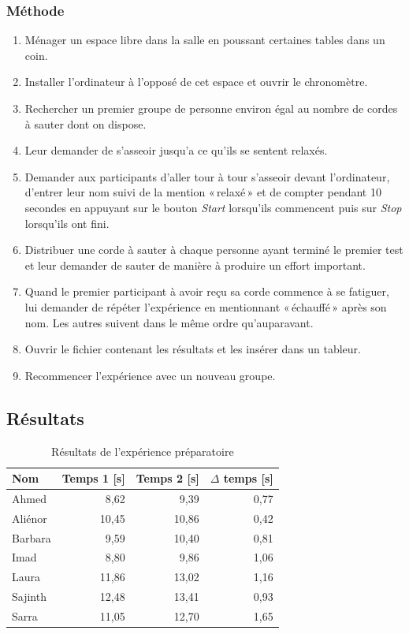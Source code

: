 \documentclass[12pt,fleqn,oneside,french,openany]{book} %
\begin{document}
\subsubsection{Méthode} \label{sssec:methode2.1}
\begin{enumerate}
	\item Ménager un espace libre dans la salle en poussant certaines tables dans un coin.
	\item Installer l'ordinateur à l'opposé de cet espace et ouvrir le chronomètre.
	\item Rechercher un premier groupe de personne environ égal au nombre de cordes à sauter dont on dispose.
	\item Leur demander de s'asseoir jusqu'a ce qu'ils se sentent relaxés.
	\item Demander aux participants d'aller tour à tour s'asseoir devant l'ordinateur, d'entrer leur nom suivi de la mention «\,relaxé\,» et de compter pendant 10 secondes en appuyant sur le bouton \emph{Start} lorsqu'ils commencent puis sur \emph{Stop} lorsqu'ils ont fini.
	\item Distribuer une corde à sauter à chaque personne ayant terminé le premier test et leur demander de sauter de manière à produire un effort important.
	\item Quand le premier participant à avoir reçu sa corde commence à se fatiguer, lui demander de répéter l'expérience en mentionnant «\,échauffé\,» après son nom. Les autres suivent dans le même ordre qu'auparavant.
	\item Ouvrir le fichier contenant les résultats et les insérer dans un tableur.
	\item Recommencer l'expérience avec un nouveau groupe.
\end{enumerate}

\subsection{Résultats} \label{ssec:resultats2.1}

\begin{table}[h]
	\centering
	\caption{Résultats de l'expérience préparatoire} \label{tbl:exp2.1}
	\begin{tabular}{lrrr}
		\toprule 
		\textbf{Nom} & \textbf{Temps 1 [s]} & \textbf{Temps 2 [s]} & \textbf{$\Delta$ temps [s]} \\ \midrule
		Ahmed & 8,62 & 9,39 & 0,77 \\
		Aliénor & 10,45 & 10,86 & 0,42 \\
		Barbara & 9,59 & 10,40 & 0,81 \\
		Imad & 8,80 & 9,86 & 1,06 \\
		Laura & 11,86 & 13,02 & 1,16 \\
		Sajinth & 12,48 & 13,41 & 0,93 \\
		Sarra & 11,05 & 12,70 & 1,65 \\ \bottomrule
	\end{tabular}
\end{table}
\clearpage
\end{document}
